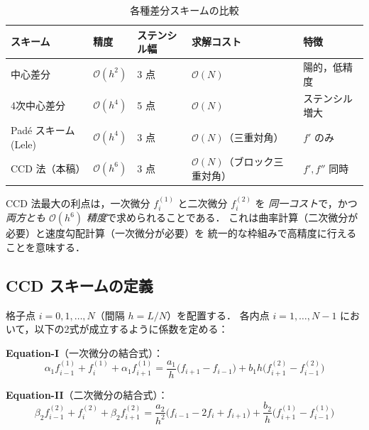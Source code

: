 \documentclass[12pt, a4paper, titlepage]{article}
\newcommand{\jp}[1]{{\normalfont\jpfont #1}}
\newcommand{\Ord}[1]{\mathcal{O}(#1)}
\newcommand{\fp}[1]{f^{(1)}_{#1}}
\newcommand{\fpp}[1]{f^{(2)}_{#1}}
\begin{document}
\begin{table}[h]
\centering
\caption{\jp{各種差分スキームの比較}}
\label{tab:scheme_compare}
\begin{tabular}{lllll}
\toprule
\jp{スキーム} & \jp{精度} & \jp{ステンシル幅} & \jp{求解コスト} & \jp{特徴}\\
\midrule
\jp{中心差分} & $\Ord{h^2}$ & 3 \jp{点} & $\Ord{N}$ & \jp{陽的，低精度}\\
\jp{4次中心差分} & $\Ord{h^4}$ & 5 \jp{点} & $\Ord{N}$ & \jp{ステンシル増大}\\
Padé \jp{スキーム (Lele)} & $\Ord{h^4}$ & 3 \jp{点} & $\Ord{N}$\jp{（三重対角）} & \jp{$f'$ のみ}\\
\jp{CCD 法（本稿）} & $\Ord{h^6}$ & 3 \jp{点} & $\Ord{N}$\jp{（ブロック三重対角）} & \jp{$f', f''$ 同時}\\
\bottomrule
\end{tabular}
\end{table}

\jp{CCD 法最大の利点は，一次微分 $f^{(1)}_i$ と二次微分 $f^{(2)}_i$ を
\emph{同一コスト}で，かつ \emph{両方とも $\Ord{h^6}$ 精度}で求められることである．
これは曲率計算（二次微分が必要）と速度勾配計算（一次微分が必要）を
統一的な枠組みで高精度に行えることを意味する．}

\subsection{CCD \jp{スキームの定義}}

\jp{格子点 $i = 0, 1, \ldots, N$（間隔 $h = L/N$）を配置する．
各内点 $i = 1, \ldots, N-1$ において，以下の2式が成立するように係数を定める：}

\begin{tcolorbox}[mybox, title={CCD \jp{スキームの2方程式}}]
\textbf{Equation-I}\jp{（一次微分の結合式）：}
\begin{equation}
  \alpha_1\fp{i-1} + \fp{i} + \alpha_1\fp{i+1}
  = \frac{a_1}{h}\bigl(f_{i+1}-f_{i-1}\bigr)
  + b_1 h\bigl(\fpp{i+1}-\fpp{i-1}\bigr)
  \label{eq:CCD_I}
\end{equation}

\textbf{Equation-II}\jp{（二次微分の結合式）：}
\begin{equation}
  \beta_2\fpp{i-1} + \fpp{i} + \beta_2\fpp{i+1}
  = \frac{a_2}{h^2}\bigl(f_{i-1}-2f_i+f_{i+1}\bigr)
  + \frac{b_2}{h}\bigl(\fp{i+1}-\fp{i-1}\bigr)
  \label{eq:CCD_II}
\end{equation}
\end{tcolorbox}
\end{document}
